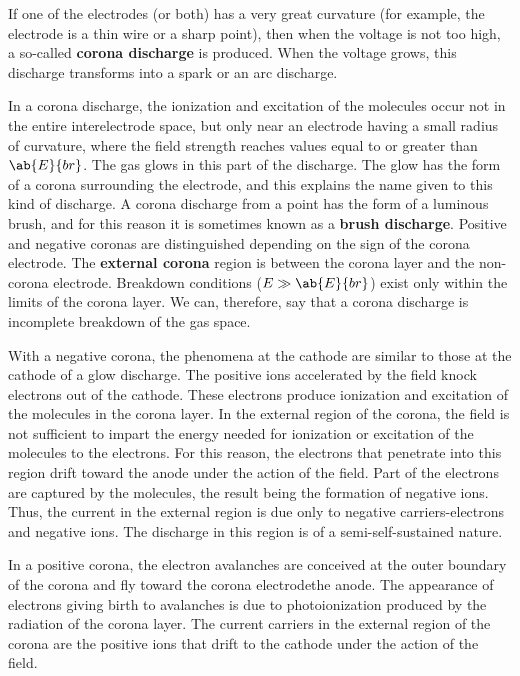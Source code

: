 If one of the electrodes (or both) has a very great curvature (for example, the electrode is a thin wire or a sharp point), then when the voltage is not too high, a so-called \textbf{corona discharge} is produced.
When the voltage grows, this discharge transforms into a spark or an arc discharge.

In a corona discharge, the ionization and excitation of the molecules occur not in the entire interelectrode space, but only near an electrode having a small radius of curvature, where the field strength reaches values equal to or greater than $\ab{E}{br}$.
The gas glows in this part of the discharge.
The glow has the form of a corona surrounding the electrode, and this explains the name given to this kind of discharge.
A corona discharge from a point has the form of a luminous brush, and for this reason it is sometimes known as a \textbf{brush discharge}.
Positive and negative coronas are distinguished depending on the sign of the corona electrode.
The \textbf{external corona} region is between the corona layer and the non-corona electrode.
Breakdown conditions ($E\gg\ab{E}{br}$) exist only within the limits of the corona layer.
We can, therefore, say that a corona discharge is incomplete breakdown of the gas space.

With a negative corona, the phenomena at the cathode are similar to those at the cathode of a glow discharge.
The positive ions accelerated by the field knock electrons out of the cathode.
These electrons produce ionization and excitation of the molecules in the corona layer.
In the external region of the corona, the field is not sufficient to impart the energy needed for ionization or excitation of the molecules to the electrons.
For this reason, the electrons that penetrate into this region drift toward the anode under the action of the field.
Part of the electrons are captured by the molecules, the result being the formation of negative ions.
Thus, the current in the external region is due only to negative carriers-electrons and negative ions.
The discharge in this region is of a semi-self-sustained nature.

In a positive corona, the electron avalanches are conceived at the outer boundary of the corona and fly toward the corona electrodethe anode.
The appearance of electrons giving birth to avalanches is due to photoionization produced by the radiation of the corona layer.
The current carriers in the external region of the corona are the positive ions that drift to the cathode under the action of the field.

